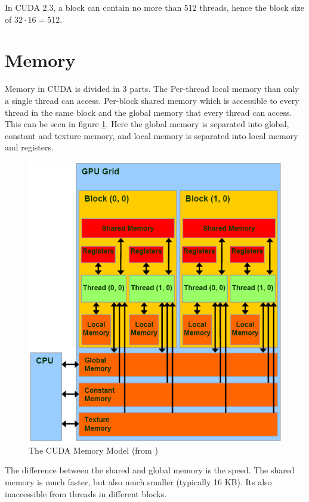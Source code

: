 In CUDA 2.3, a block can contain no more than 512 threads, hence the
block size of $32\cdot 16 = 512$.


\section{Memory}

Memory in CUDA is divided in 3 parts. The Per-thread local memory than
only a single thread can access. Per-block shared memory which is
accessible to every thread in the same block and the global memory
that every thread can access. This can be seen in figure
\ref{fig:cudaMem}. Here the global memory is separated into global,
constant and texture memory, and local memory is separated into local
memory and registers.


\begin{figure}[h]
  \centering
  \includegraphics[width=\textwidth]{imgs/cudaMem}
  \caption{The CUDA Memory Model (from )}
  \label{fig:cudaMem}
\end{figure}

The difference between the shared and global memory is the speed. The
shared memory is much faster, but also much smaller (typically 16
KB). Its also inaccessible from threads in different blocks.

